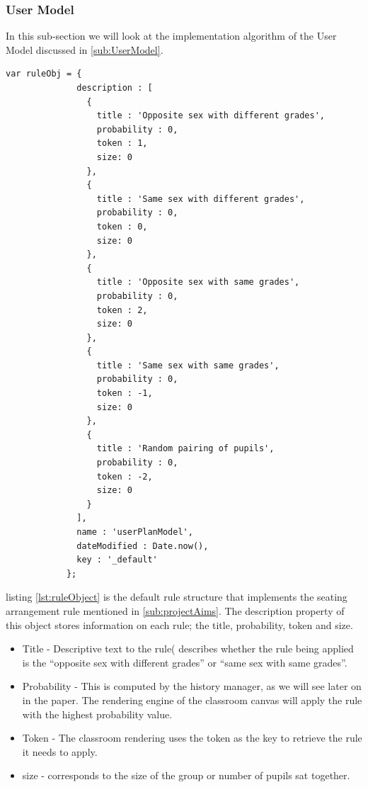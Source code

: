 \subsubsection{User Model}
In this sub-section we will look at the implementation algorithm of the User Model discussed in \ref{sub:UserModel}.

\begin{lstlisting}[caption={default rule object}, label={lst:ruleObject}]
                var ruleObj = {
              description : [
                {
                  title : 'Opposite sex with different grades',
                  probability : 0,
                  token : 1,
                  size: 0
                },
                {
                  title : 'Same sex with different grades',
                  probability : 0,
                  token : 0,
                  size: 0
                },
                {
                  title : 'Opposite sex with same grades',
                  probability : 0,
                  token : 2,
                  size: 0
                },
                {
                  title : 'Same sex with same grades',
                  probability : 0,
                  token : -1,
                  size: 0
                },
                {
                  title : 'Random pairing of pupils',
                  probability : 0,
                  token : -2,
                  size: 0
                }
              ],
              name : 'userPlanModel',
              dateModified : Date.now(),
              key : '_default'
            };
\end{lstlisting}
listing \ref{lst:ruleObject} is the default rule structure that implements the seating arrangement rule mentioned in \ref{sub:projectAims}. The description property of this object stores information on each rule; the title, probability, token and size.
\begin{itemize}
    \item Title - Descriptive text to the rule( describes whether the rule being applied is the ``opposite sex with different grades'' or ``same sex with same grades''.
    \item Probability - This is computed by the history manager, as we will see later on in the paper. The rendering engine of the classroom canvas will apply the rule with the highest probability value.
    \item Token - The classroom rendering uses the token as the key to retrieve the rule it needs to apply.
    \item size - corresponds to the size of the group or number of pupils sat together. 
\end{itemize}
 
